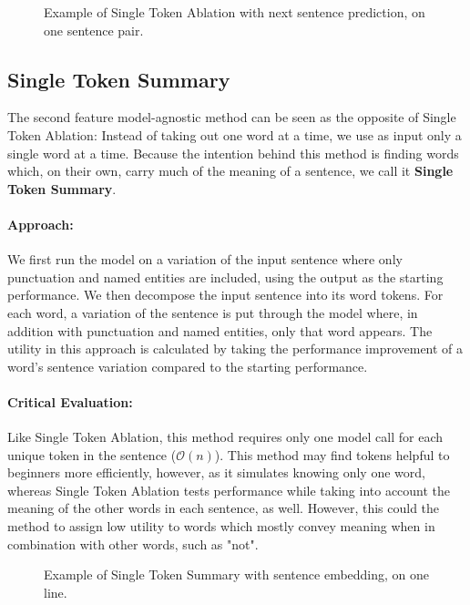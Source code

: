 \begin{figure}[H]
	
	\caption{Example of Single Token Ablation with next sentence prediction, on one sentence pair.}
	\label{fig:single-token-ablation-nsp}
\end{figure}

\subsection{Single Token Summary}
The second feature model-agnostic method can be seen as the opposite of Single Token Ablation:
Instead of taking out one word at a time, we use as input only a single word at a time.
Because the intention behind this method is finding words which, on their own, carry much of the meaning of a sentence, we call it \textbf{Single Token Summary}.

\paragraph{Approach:}
We first run the model on a variation of the input sentence where only punctuation and named entities are included, using the output as the starting performance.
We then decompose the input sentence into its word tokens.
For each word, a variation of the sentence is put through the model where, in addition with punctuation and named entities, only that word appears.
The utility in this approach is calculated by taking the performance improvement of a word's sentence variation compared to the starting performance.

\paragraph{Critical Evaluation:}
Like Single Token Ablation, this method requires only one model call for each unique token in the sentence ($\mathcal{O}(n)$).
This method may find tokens helpful to beginners more efficiently, however, as it simulates knowing only one word, whereas Single Token Ablation tests performance while taking into account the meaning of the other words in each sentence, as well.
However, this could the method to assign low utility to words which mostly convey meaning when in combination with other words, such as "not".

\begin{figure}[H]
	
	\caption{Example of Single Token Summary with sentence embedding, on one line.}
	\label{fig:single-token-summary}
\end{figure}


